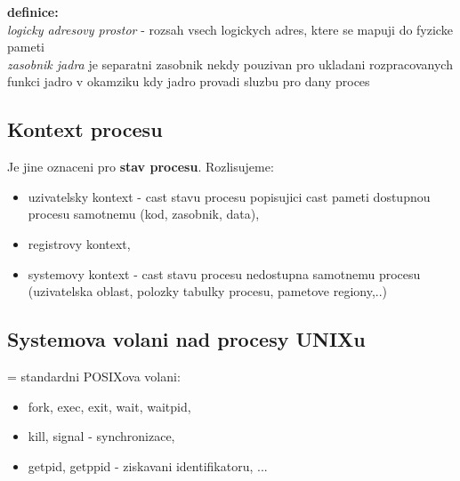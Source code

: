 \documentclass[a4paper, 11pt]{article}
\begin{document}
\textbf{definice:} \\[0.5em]
\textit{logicky adresovy prostor} - rozsah vsech logickych adres, ktere se mapuji do fyzicke pameti \\[0.2em]
\textit{zasobnik jadra} je separatni zasobnik nekdy pouzivan pro ukladani rozpracovanych funkci jadro v okamziku kdy jadro provadi sluzbu pro dany proces \\

\subsection{Kontext procesu}
Je jine oznaceni pro \textbf{stav procesu}. Rozlisujeme:
\begin{itemize}
    \item uzivatelsky kontext - cast stavu procesu popisujici cast pameti dostupnou procesu samotnemu (kod, zasobnik, data),
    \item registrovy kontext,
    \item systemovy kontext - cast stavu procesu nedostupna samotnemu procesu (uzivatelska oblast, polozky tabulky procesu, pametove regiony,..) \\
\end{itemize}

\newpage

\subsection{Systemova volani nad procesy UNIXu}
= standardni POSIXova volani:
\begin{itemize}
    \item fork, exec, exit, wait, waitpid,
    \item kill, signal - synchronizace,
    \item getpid, getppid - ziskavani identifikatoru, ... \\
\end{itemize}
\end{document}
